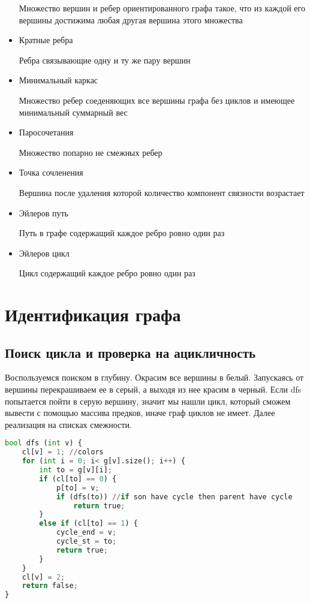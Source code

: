 \begin{itemize}
    \begin{mydef}
        Множество вершин и ребер ориентированного графа такое, что из каждой его           вершины достижима любая другая вершина этого множества
    \end{mydef}
\item     
    Кратные ребра
    \begin{mydef}
        Ребра связывающие одну и ту же пару вершин
    \end{mydef}
\item     
    Минимальный каркас
    \begin{mydef}
        Множество ребер соеденяющих все вершины графа без циклов и имеющее               минимальный суммарный вес
    \end{mydef}
\item     
    Паросочетания
    \begin{mydef}
        Множество попарно не смежных ребер
    \end{mydef}
\item     
    Точка сочленения
    \begin{mydef}
        Вершина после удаления которой количество компонент связности возрастает
    \end{mydef}
\item     
    Эйлеров путь
    \begin{mydef}
        Путь в графе содержащий каждое ребро ровно один раз
    \end{mydef}
\item     
    Эйлеров цикл
    \begin{mydef}
        Цикл содержащий каждое ребро ровно один раз
    \end{mydef}
\end{itemize}
\section{Идентификация графа}
\subsection{Поиск цикла и проверка на ацикличность}
Воспользуемся поиском в глубину. Окрасим все вершины в белый. Запускаясь от вершины перекрашиваем ее в серый, а выходя из нее красим в черный. Если dfs попытается пойти в серую вершину, значит мы нашли цикл, который сможем вывести с помощью массива предков, иначе граф циклов не имеет. Далее реализация на списках смежности.
\begin{lstlisting}[language=Python]
bool dfs (int v) {
	cl[v] = 1; //colors
	for (int i = 0; i< g[v].size(); i++) {
		int to = g[v][i];
		if (cl[to] == 0) {
			p[to] = v; 
			if (dfs(to)) //if son have cycle then parent have cycle
			    return true;
		}
		else if (cl[to] == 1) {
			cycle_end = v;
			cycle_st = to;
			return true;
		}
	}
	cl[v] = 2;
	return false;
}
\end{lstlisting}
